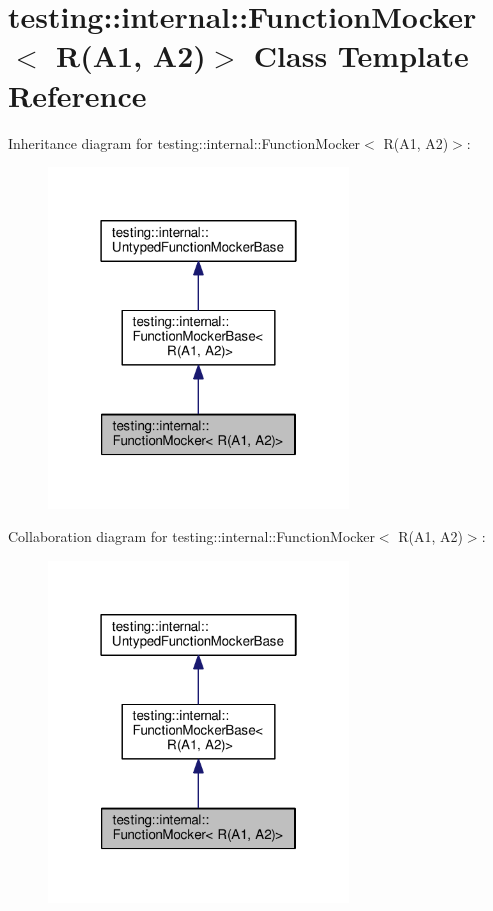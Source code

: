 \hypertarget{classtesting_1_1internal_1_1_function_mocker_3_01_r_07_a1_00_01_a2_08_4}{}\section{testing\+:\+:internal\+:\+:Function\+Mocker$<$ R(A1, A2)$>$ Class Template Reference}
\label{classtesting_1_1internal_1_1_function_mocker_3_01_r_07_a1_00_01_a2_08_4}


Inheritance diagram for testing\+:\+:internal\+:\+:Function\+Mocker$<$ R(A1, A2)$>$\+:
\nopagebreak
\begin{figure}[H]
\begin{center}
\leavevmode
\includegraphics[width=226pt]{classtesting_1_1internal_1_1_function_mocker_3_01_r_07_a1_00_01_a2_08_4__inherit__graph}
\end{center}
\end{figure}


Collaboration diagram for testing\+:\+:internal\+:\+:Function\+Mocker$<$ R(A1, A2)$>$\+:
\nopagebreak
\begin{figure}[H]
\begin{center}
\leavevmode
\includegraphics[width=226pt]{classtesting_1_1internal_1_1_function_mocker_3_01_r_07_a1_00_01_a2_08_4__coll__graph}
\end{center}
\end{figure}
